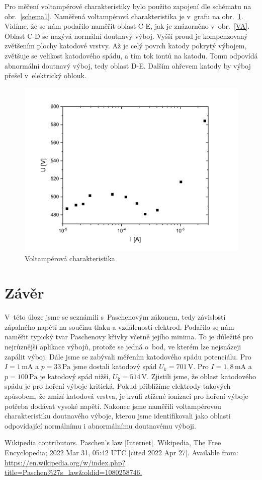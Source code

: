 \documentclass[a4paper,12pt]{article}
\begin{document}
\newpage
Pro měření voltampérové charakteristiky bylo použito zapojení dle schématu na 
obr.~\ref{schema1}. Naměřená voltampérová charakteristika je v~grafu na 
obr.~\ref{VAodpor}. Vidíme, 
že se nám podařilo naměřit oblast C-E, jak je znázorněno v~obr.~\ref{VA}. 
Oblast C-D se nazývá normální doutnavý výboj. Vyšší proud je kompenzovaný 
zvětšením plochy katodové vrstvy. Až je celý povrch katody pokrytý výbojem, 
zvětšuje 
se velikost katodového spádu, a tím tok iontů na katodu. Tomu odpovídá 
abnormální doutnavý výboj, tedy oblast D-E. Dalším ohřevem katody by výboj 
přešel v~elektrický oblouk.

\begin{figure}[h!]
	\centering
	\includegraphics[width=145mm]{graph1.png}
	\caption{Voltampérová charakteristika}
	\label{VAodpor}
\end{figure}

\clearpage
\section{Závěr}
V~této úloze jsme se seznámili s~Paschenovým zákonem, tedy závislostí zápalného 
napětí na součinu tlaku a vzdálenosti elektrod. Podařilo se nám naměřit typický 
tvar Paschenovy křivky včetně jejího minima. To je důležité pro nejrůznější 
aplikace výbojů, protože se jedná o~bod, ve kterém lze nejsnázeji zapálit výboj.
Dále jsme se zabývali měřením katodového spádu potenciálu. Pro 
$I = 1\,\si{\milli\ampere}$ a $p = 33\,\si{\pascal}$ jsme dostali katodový spád 
$U_\text{k} = 701\,\si{\volt}$. Pro $I = 1,8\,\si{\milli\ampere}$ a $p = 
100\,\si{\pascal}$ je katodový spád nižší,  $U_\text{k} = 514\,\si{\volt}$. 
Zjistili jsme, že oblast katodového spádu je pro hoření výboje kritická. Pokud 
přiblížíme elektrody takových způsobem, že zmizí katodová vrstva, je kvůli 
ztížené ionizaci pro hoření výboje potřeba dodávat vysoké napětí. Nakonec jsme 
naměřili voltampérovou charakteristiku doutnavého výboje, kterou jsme 
identifikovali jako oblasti odpovídající normálnímu i abnormálnímu doutnavému 
výboji.

\begin{thebibliography}{10}
	Wikipedia contributors. Paschen's law [Internet]. Wikipedia, The Free 
	Encyclopedia; 2022 Mar 31, 05:42 UTC [cited 2022 Apr 27]. Available from: 
	\url{https://en.wikipedia.org/w/index.php?title=Paschen%27s_law&oldid=1080258746.}

\end{thebibliography}
\end{document}

